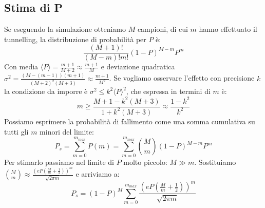 \documentclass[italian]{article}
\begin{document}
	\subsection{Stima di P}
	Se eseguendo la simulazione otteniamo $M$ campioni, di cui $m$ hanno effettuato il tunnelling, la distribuzione di probabilità per $P$ è:
	\begin{equation}
		\frac{\left(M+1\right)!}{\left(M-m\right)!m!}(1-P)^{M-m}P^{m}
	\end{equation}
	Con media $\langle P\rangle=\frac{m+1}{M+2} \approx \frac{m+1}{M}$ e deviazione quadratica $\sigma^2 =\frac{\left(M-\left(m-1\right)\right)\left(m+1\right)}{\left(M+2\right)^{2}\left(M+3\right)} \approx \frac{m+1}{M^2}$. Se vogliamo osservare l'effetto con precisione $k$ la condizione da imporre è $\sigma^2 \le k^2 \langle P\rangle^2 $, che espressa in termini di $m$ è:
	\begin{equation*}
		m \ge \frac{M+1 - k^2(M+3)}{1 + k^2(M+3)} \approx \frac{1-k^2}{k^2}
	\end{equation*}
	Possiamo esprimere la probabilità di fallimento come una somma cumulativa su tutti gli $m$ minori del limite:
	\begin{equation}
		P_s =  \sum_{m=0}^{m_{max}} P(m) =  \sum_{m=0}^{m_{max}} {M\choose m}(1-P)^{M-m}P^m
	\end{equation}
	Per stimarlo passiamo nel limite di $P$ molto piccolo: $M \gg m$.
	Sostituiamo ${M\choose m} \approx \frac{\left(eP\left(\frac{M}{m}+\frac{1}{2}\right)\right)^{m}}{\sqrt{2\pi m}}$ e arriviamo a:
	\begin{equation}
	P_s = \left({1-P} \right)^M \sum_{m=0}^{m_{max}}
	 \frac{\left(eP\left(\frac{M}{m}+\frac{1}{2}\right)\right)^{m}}{\sqrt{2\pi m}}
	\end{equation}
\end{document}
